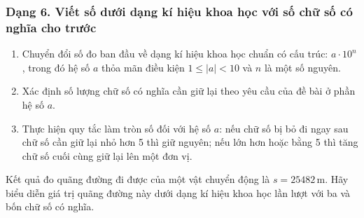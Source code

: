 \subsubsection{Dạng 6. Viết số dưới dạng kí hiệu khoa học với số chữ số có nghĩa cho trước}
\begin{phuongphap}
\begin{enumerate}
\item Chuyển đổi số đo ban đầu về dạng kí hiệu khoa học chuẩn có cấu trúc: $a \cdot 10^n$, trong đó hệ số $a$ thỏa mãn điều kiện $1 \le |a| < 10$ và $n$ là một số nguyên.
\item Xác định số lượng chữ số có nghĩa cần giữ lại theo yêu cầu của đề bài ở phần hệ số $a$.
\item Thực hiện quy tắc làm tròn số đối với hệ số $a$: nếu chữ số bị bỏ đi ngay sau chữ số cần giữ lại nhỏ hơn 5 thì giữ nguyên; nếu lớn hơn hoặc bằng 5 thì tăng chữ số cuối cùng giữ lại lên một đơn vị.
\end{enumerate}
\end{phuongphap}
\begin{vidumau}
Kết quả đo quãng đường đi được của một vật chuyển động là $s = 25482\,\mathrm{m}$. Hãy biểu diễn giá trị quãng đường này dưới dạng kí hiệu khoa học lần lượt với ba và bốn chữ số có nghĩa.
\end{vidumau}